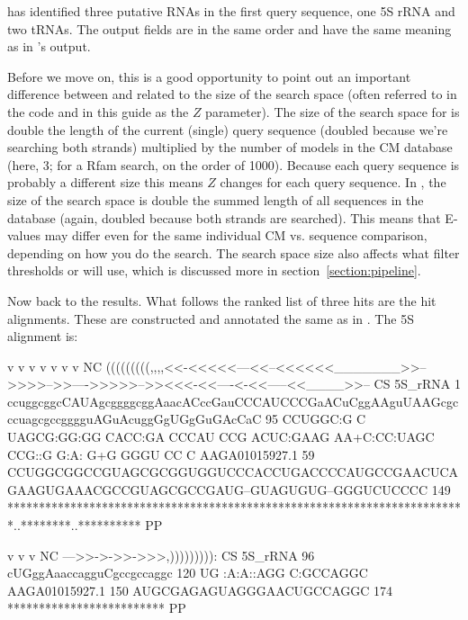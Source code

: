  has identified three putative RNAs in the first query
sequence, one 5S rRNA and two tRNAs. The output fields are in the
same order and have the same meaning as in 's output.

Before we move on, this is a good opportunity to point out an
important difference between  and  related
to the size of the search space (often referred to in the code and in
this guide as the $Z$ parameter).  The size of the search space for
 is double the length of the current (single) query
sequence (doubled because we're searching both strands) multiplied by
the number of models in the CM database (here, 3; for a Rfam search,
on the order of 1000). Because each query sequence is probably a
different size this means $Z$ changes for each query sequence. In
, the size of the search space is double the summed
length of all sequences in the database (again, doubled because both
strands are searched). This means that E-values may differ even for
the same individual CM vs. sequence comparison, depending on how you
do the search. The search space size also affects what filter
thresholds  or  will use, which is
discussed more in section~\ref{section:pipeline}.

Now back to the  results. What follows the ranked list of
three hits are the hit alignments. These are constructed and annotated
the same as in . The 5S alignment is:

\begin{widesreoutput}
                             v               v       v         v         v             v            v                NC
                     (((((((((,,,,<<-<<<<<---<<--<<<<<<_______>>-->>>>-->>---->>>>>-->><<<-<<----<-<<-----<<____>>-- CS
         5S_rRNA   1 ccuggcggcCAUAgcggggcggAaacACccGauCCCAUCCCGaACuCggAAguUAAGcgcccuagcgccgggguAGuAcuggGgUGgGuGAcCaC 95 
                     CCUGGC:G C UAGCG:GG:GG   CACC:GA CCCAU CCG ACUC:GAAG  AA+C:CC:UAGC CCG::G  G:A: G+G  GGGU  CC C
  AAGA01015927.1  59 CCUGGCGGCCGUAGCGCGGUGGUCCCACCUGACCCCAUGCCGAACUCAGAAGUGAAACGCCGUAGCGCCGAUG--GUAGUGUG--GGGUCUCCCC 149
                     *************************************************************************..********..********** PP

                        v         v v          NC
                     --->>->->>->>>,))))))))): CS
         5S_rRNA  96 cUGggAaaccagguCgccgccaggc 120
                      UG :A:A::AGG   C:GCCAGGC
  AAGA01015927.1 150 AUGCGAGAGUAGGGAACUGCCAGGC 174
                     ************************* PP
\end{widesreoutput}

